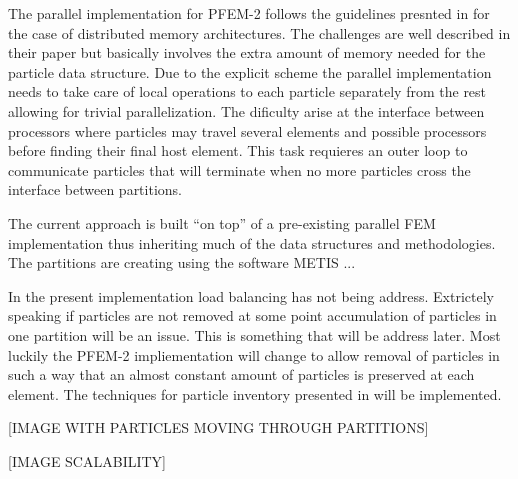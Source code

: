 The parallel implementation for PFEM-2 follows the guidelines presnted in \cite{gimenez:parallel} for the case of distributed memory architectures. The challenges are well described in their paper but basically involves the extra amount of memory needed for the particle data structure. Due to the explicit scheme the parallel implementation needs to take care of local operations to each particle separately from the rest allowing for trivial parallelization. The dificulty arise at the interface between processors where particles may travel several elements and possible processors before finding their final host element. This task requieres an outer loop to communicate particles that will terminate when no more particles cross the interface between partitions.

The current approach is built ``on top'' of a pre-existing parallel FEM implementation thus inheriting much of the data structures and methodologies. The partitions are creating using the software METIS \cite{metis}...

In the present implementation load balancing has not being address. Extrictely speaking if particles are not removed at some point accumulation of particles in one partition will be an issue. This is something that will be address later. Most luckily the PFEM-2 impliementation will change to allow removal of particles in such a way that an almost constant amount of particles is preserved at each element. The techniques for particle inventory presented in \cite{gimenez-difusion} will be implemented.



[IMAGE WITH PARTICLES MOVING THROUGH PARTITIONS]



[IMAGE SCALABILITY]


 
